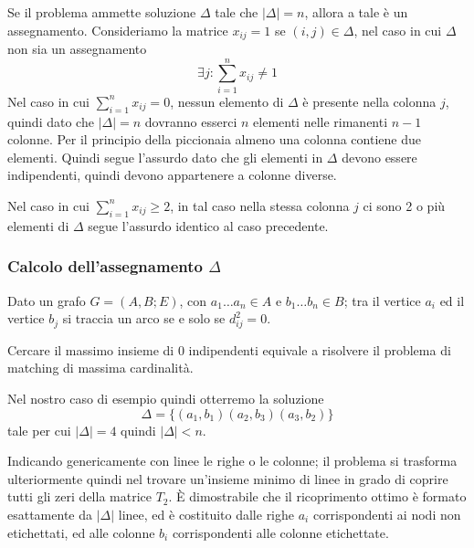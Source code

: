 \documentclass[../template]{subfiles}
\begin{document}
Se il problema ammette soluzione $\Delta$ tale che $|\Delta| = n$, allora a tale è un assegnamento.
Consideriamo la matrice $x_{ij} = 1$ se $(i, j) \in \Delta$, nel caso in cui $\Delta$ non sia un assegnamento
\[
    \exists j : \sum_{i=1}^n x_{ij} \neq 1
\]
Nel caso in cui $\sum^n_{i=1} x_{ij} = 0$, nessun elemento di $\Delta$ è presente nella colonna $j$, quindi dato che
$|\Delta| = n$ dovranno esserci $n$ elementi nelle rimanenti $n-1$ colonne. Per il principio della piccionaia almeno una
colonna contiene due elementi. Quindi segue l'assurdo dato che gli elementi in $\Delta$ devono essere indipendenti,
quindi devono appartenere a colonne diverse.

Nel caso in cui $\sum^n_{i=1} x_{ij} \ge 2$, in tal caso nella stessa colonna $j$ ci sono 2 o più elementi di $\Delta$
segue l'assurdo identico al caso precedente.
\subsubsection{Calcolo dell'assegnamento $\Delta$}
Dato un grafo $G = (A,B;E)$, con $a_1\dots a_n \in A$ e $b_1 \dots b_n \in B$; tra il vertice $a_i$ ed il vertice $b_j$
si traccia un arco se e solo se $d_{ij}^2 = 0$.

Cercare il massimo insieme di 0 indipendenti equivale a risolvere il problema di matching di massima cardinalità.

Nel nostro caso di esempio quindi otterremo la soluzione
\[
    \Delta = \big\{(a_1, b_1) (a_2, b_3) (a_3, b_2)\big\}
\]
tale per cui $|\Delta| = 4$ quindi $|\Delta| < n$.

Indicando genericamente con linee le righe o le colonne; il problema si trasforma ulteriormente quindi nel trovare
un'insieme minimo di linee in grado di coprire tutti gli zeri della matrice $T_2$.
È dimostrabile che il ricoprimento ottimo è formato esattamente da $|\Delta|$ linee, ed è costituito dalle righe $a_i$
corrispondenti ai nodi non etichettati, ed alle colonne $b_i$ corrispondenti alle colonne etichettate.
\usetikzlibrary{matrix}
\begin{table}[h]
    \centering
\end{table}
\end{document}
